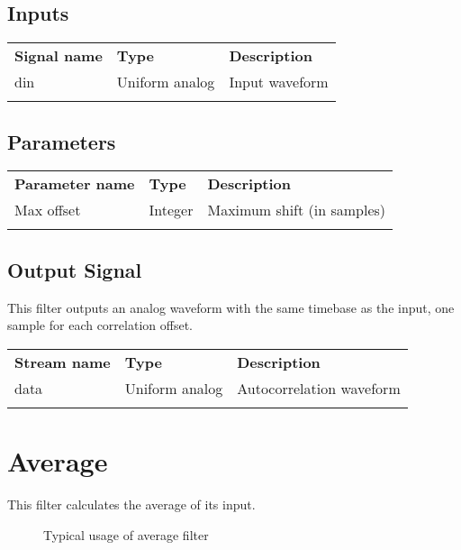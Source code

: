 \subsection{Inputs}

\begin{tabularx}{16cm}{llX}
\thickhline
\textbf{Signal name} & \textbf{Type} & \textbf{Description} \\
\thickhline
din & Uniform analog & Input waveform \\
\thickhline
\end{tabularx}

\subsection{Parameters}

\begin{tabularx}{16cm}{llX}
\thickhline
\textbf{Parameter name} & \textbf{Type} & \textbf{Description} \\
\thickhline
Max offset & Integer & Maximum shift (in samples)\\
\thickhline
\end{tabularx}

\subsection{Output Signal}

This filter outputs an analog waveform with the same timebase as the input, one sample for each correlation offset.

\begin{tabularx}{16cm}{llX}
\thickhline
\textbf{Stream name} & \textbf{Type} & \textbf{Description} \\
\thickhline
data & Uniform analog & Autocorrelation waveform \\
\thickhline
\end{tabularx}

\pagebreak
\section{Average}
\label{filter:average}

This filter calculates the average of its input.

\begin{figure}[h]
\centering
{}
\caption{Typical usage of average filter}
\label{filter_average}
\end{figure}

